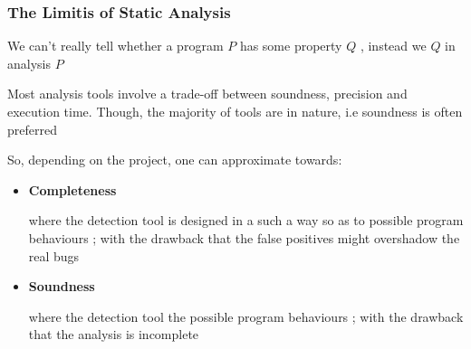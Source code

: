 	\subsubsection{The Limitis of Static Analysis}
		
		\par{We can't really tell whether a program $P$ has some property $Q$ ,
instead we  $Q$ in analysis $P$}	




	\par{Most analysis tools involve a trade-off between soundness, precision
and execution time. Though, the majority of tools are  in
nature, i.e soundness is often preferred}

	\par{So, depending on the project, one can approximate towards:}
		\begin{itemize}
			\item\textbf{Completeness}\par{where the detection tool is
designed in a such a way so as to  possible program behaviours ;
with the drawback that the false positives might overshadow the real bugs}
			\item\textbf{Soundness}\par{where the detection tool
 the possible program behaviours ; with the drawback that the analysis is
incomplete}
		\end{itemize}

 
